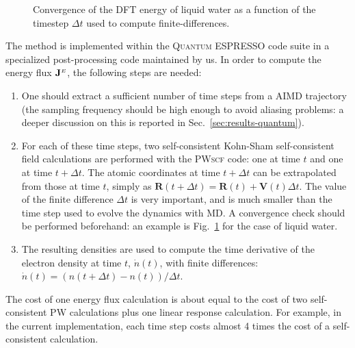 \begin{figure}
    \centering
    \caption{Convergence of the DFT energy of liquid water as a function of the timestep $\Delta t$ used to compute finite-differences.}
    \label{fig:dft-curr-timestep-water}
\end{figure}
The method is implemented within the \textsc{Quantum ESPRESSO} code suite \cite{Giannozzi2009,Giannozzi2017} in a specialized post-processing code maintained by us. 
In order to compute the energy flux $\mathbf{J}^{\scriptscriptstyle E}$, the following steps are needed: 
\begin{enumerate}
    \item One should extract a sufficient number of time steps from a AIMD trajectory (the sampling frequency should be high enough to avoid aliasing problems: a deeper discussion on this is reported in Sec.~\ref{sec:results-quantum}). 
    \item For each of these time steps, two self-consistent Kohn-Sham self-consistent field calculations are performed with the \textsc{PWscf} code: one at time $t$ and one at time $t+\Delta t$. The atomic coordinates at time $t+\Delta t$ can be extrapolated from those at time $t$, simply as $\mathbf{R}(t+\Delta t) = \mathbf{R}(t) + \mathbf{V}(t) \Delta t$. The value of the finite difference $\Delta t$ is very important, and is much smaller than the time step used to evolve the dynamics with MD. A convergence check should be performed beforehand: an example is Fig.~\ref{fig:dft-curr-timestep-water} for the case of liquid water.
    \item The resulting densities are used to compute the time derivative of the electron density at time $t$, $\dot{n}(t)$, with finite differences: $\dot{n}(t) = (n(t+\Delta t) - n(t))/\Delta t$.
\end{enumerate}
The cost of one energy flux calculation is about equal to the cost of two self-consistent \textsc{PW} calculations plus one linear response calculation. For example, in the current implementation, each time step costs almost 4 times the cost of a self-consistent calculation.

\bigskip
{}



